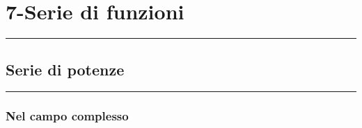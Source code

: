 \section*{7-Serie di funzioni}
\rule{\textwidth}{2pt}
\subsection*{Serie di potenze}
\rule{\textwidth}{0,4pt}
\subsubsection*{Nel campo complesso}
